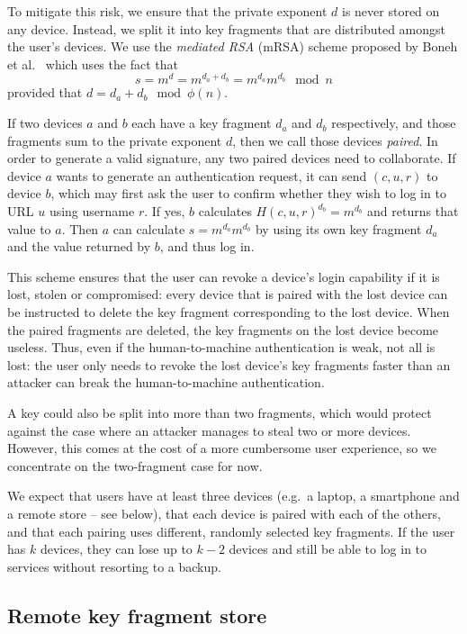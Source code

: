 To mitigate this risk, we ensure that the private exponent $d$ is never stored on any device.
Instead, we split it into key fragments that are distributed amongst the user's devices. We use the
\emph{mediated RSA} (mRSA) scheme proposed by Boneh et al.~\cite{Boneh01} which uses the fact that
$$s = m^d = m^{d_a + d_b} = m^{d_a} m^{d_b} \mod n$$ provided that $d = d_a + d_b \mod \phi(n)$.

If two devices $a$ and $b$ each have a key fragment $d_a$ and $d_b$ respectively, and those
fragments sum to the private exponent $d$, then we call those devices \emph{paired}. In order to
generate a valid signature, any two paired devices need to collaborate. If device $a$ wants to
generate an authentication request, it can send $(c, u, r)$ to device $b$, which may first ask the
user to confirm whether they wish to log in to URL $u$ using username $r$. If yes, $b$ calculates
$H(c, u, r)^{d_b} = m^{d_b}$ and returns that value to $a$. Then $a$ can calculate
$s = m^{d_a} m^{d_b}$ by using its own key fragment $d_a$ and the value returned by $b$, and thus
log in.

This scheme ensures that the user can revoke a device's login capability if it is lost, stolen or
compromised: every device that is paired with the lost device can be instructed to delete the key
fragment corresponding to the lost device. When the paired fragments are deleted, the key fragments
on the lost device become useless. Thus, even if the human-to-machine authentication is weak, not
all is lost: the user only needs to revoke the lost device's key fragments faster than an attacker
can break the human-to-machine authentication.

A key could also be split into more than two fragments, which would protect against the case where
an attacker manages to steal two or more devices. However, this comes at the cost of a more
cumbersome user experience, so we concentrate on the two-fragment case for now.

We expect that users have at least three devices (e.g.\ a laptop, a smartphone and a remote store --
see below), that each device is paired with each of the others, and that each pairing uses
different, randomly selected key fragments. If the user has $k$ devices, they can lose up to $k-2$
devices and still be able to log in to services without resorting to a backup.

\subsection{Remote key fragment store}

